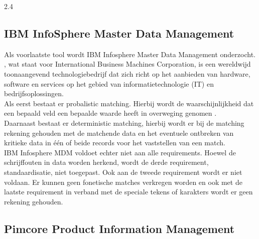 2.4	\subsection{IBM InfoSphere Master Data Management}
Als voorlaatste tool wordt IBM Infosphere Master Data Management onderzocht. 
\textcite{IBMAbout}, wat staat voor International Business Machines Corporation, is een wereldwijd toonaangevend technologiebedrijf dat zich richt op het aanbieden van hardware, software en services op het gebied van informatietechnologie (IT) en bedrijfsoplossingen.
\\Als eerst bestaat er probalistic matching.  Hierbij wordt de waarschijnlijkheid dat een bepaald veld een bepaalde waarde heeft in overweging genomen \autocite{IBMMatching}.
\\Daarnaast bestaat er deterministic matching, hierbij wordt er bij de matching rekening gehouden met de matchende data en het eventuele ontbreken van kritieke data in één of beide records voor het vaststellen van een match. 
\\IBM Infosphere MDM voldoet echter niet aan alle requirements. Hoewel de schrijffouten in data worden herkend, wordt de derde requirement, standaardisatie, niet toegepast. Ook aan de tweede requirement wordt er niet voldaan. Er kunnen geen fonetische matches verkregen worden en ook met de laatste requirement in verband met de speciale tekens of karakters wordt er geen rekening gehouden.

\subsection{Pimcore Product Information Management}

